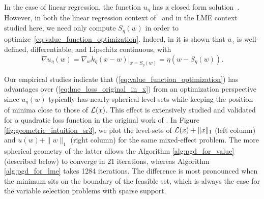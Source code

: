 In the case of linear regression, 
the function $u_\eta$ has a closed form solution~\cite{Zheng2019SR3}. However, in both  the linear regression context of~\cite{Zheng2019SR3} 
and in the LME context studied here, we need only compute $S_\eta(w)$ 
in order to optimize~\eqref{eq:value_function_optimization}. 
Indeed, in \cite[Section 5]{Theory1} it is shown that $u_\gamma$ is well-defined, 
differentiable, and Lipschitz continuous, with
\begin{equation}\label{eq:grad_value_function_explicit}
\nabla u_\eta(w) = \nabla_w k_\eta(x-w)|_{x = S_\eta(w)}=\eta(w-S_\eta(w)) .  
\end{equation}

Our empirical studies indicate that 
(\ref{eq:value_function_optimization}) has advantages over (\ref{eq:lme_loss_original_in_x})
from an optimization perspective since $u_\eta(w)$ typically has nearly spherical level-sets while keeping the position of minima close to those of $\operatorname{\mathcal{L}}(x)$. This effect is extensively studied and validated for a quadratic loss function in the original work  of \cite{Zheng2019SR3}. 
In Figure \ref{fig:geometric_intuition_sr3}, we plot the level-sets of $\operatorname{\mathcal{L}}(x) + \|x\|_1$ (left column) and $u(w) + \|w\|_1$ (right column) for the same mixed-effect problem. 
The more spherical geometry of the latter allows the Algorithm \ref{alg:pgd_for_value} 
(described below) to converge in 21 iterations, whereas Algorithm \ref{alg:pgd_for_lme} takes 1284 iterations. The difference is most pronounced when the minimum sits on the boundary of the feasible set, which is always the case for the variable selection problems with sparse support.

%

